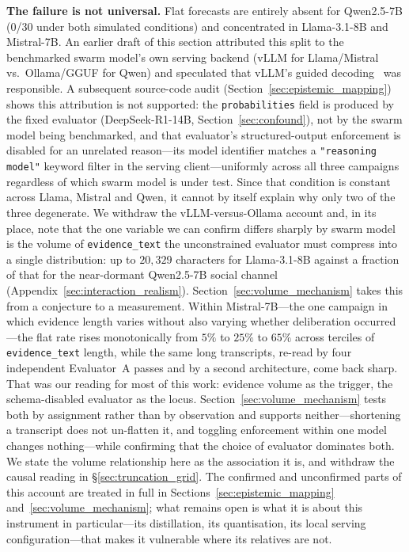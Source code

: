 \documentclass[11pt,journal,onecolumn]{IEEEtran}
\begin{document}
\textbf{The failure is not universal.} Flat forecasts are entirely absent for Qwen2.5-7B (0/30 under both simulated conditions) and concentrated in Llama-3.1-8B and Mistral-7B. An earlier draft of this section attributed this split to the benchmarked swarm model's own serving backend (vLLM for Llama/Mistral vs.\ Ollama/GGUF for Qwen) and speculated that vLLM's guided decoding~\cite{vllm_guided} was responsible. A subsequent source-code audit (Section~\ref{sec:epistemic_mapping}) shows this attribution is not supported: the \texttt{probabilities} field is produced by the fixed evaluator (DeepSeek-R1-14B, Section~\ref{sec:confound}), not by the swarm model being benchmarked, and that evaluator's structured-output enforcement is disabled for an unrelated reason---its model identifier matches a \texttt{"reasoning model"} keyword filter in the serving client---uniformly across all three campaigns regardless of which swarm model is under test. Since that condition is constant across Llama, Mistral and Qwen, it cannot by itself explain why only two of the three degenerate. We withdraw the vLLM-versus-Ollama account and, in its place, note that the one variable we can confirm differs sharply by swarm model is the volume of \texttt{evidence\_text} the unconstrained evaluator must compress into a single distribution: up to $20{,}329$ characters for Llama-3.1-8B against a fraction of that for the near-dormant Qwen2.5-7B social channel (Appendix~\ref{sec:interaction_realism}). Section~\ref{sec:volume_mechanism} takes this from a conjecture to a measurement. Within Mistral-7B---the one campaign in which evidence length varies without also varying whether deliberation occurred---the flat rate rises monotonically from $5\%$ to $25\%$ to $65\%$ across terciles of \texttt{evidence\_text} length, while the same long transcripts, re-read by four independent Evaluator~A passes and by a second architecture, come back sharp. That was our reading for most of this work: evidence volume as the trigger, the schema-disabled evaluator as the locus. Section~\ref{sec:volume_mechanism} tests both by assignment rather than by observation and supports neither---shortening a transcript does not un-flatten it, and toggling enforcement within one model changes nothing---while confirming that the choice of evaluator dominates both. We state the volume relationship here as the association it is, and withdraw the causal reading in \S\ref{sec:truncation_grid}. The confirmed and unconfirmed parts of this account are treated in full in Sections~\ref{sec:epistemic_mapping} and~\ref{sec:volume_mechanism}; what remains open is what it is about this instrument in particular---its distillation, its quantisation, its local serving configuration---that makes it vulnerable where its relatives are not.
\end{document}
